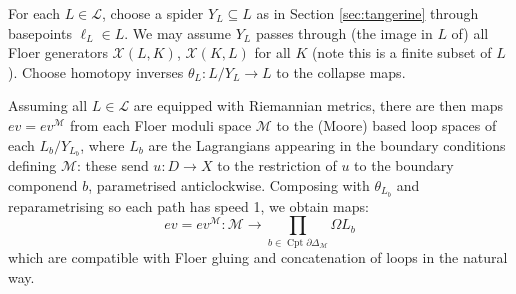\documentclass{TPmod}
\newcommand{\Cptd}{\operatorname{Cpt}\partial}
\newcommand{\cL}{\mathcal{L}}
\newcommand{\cM}{\mathcal{M}}
\newcommand{\cX}{\mathcal{X}}
\numberwithin{equation}{section}
\begin{document}
    For each $L \in \cL$, choose a spider $Y_L \subseteq L$ as in Section \ref{sec:tangerine} through basepoints $\ell_L \in L$. We may assume $Y_L$ passes through (the image in $L$ of) all Floer generators $\cX(L, K)$, $\cX(K, L)$ for all $K$ (note this is a finite subset of $L$). Choose homotopy inverses $\theta_L: L/{Y_L} \to L$ to the collapse maps.

    Assuming all $L \in \cL$ are equipped with Riemannian metrics, there are then maps $ev=ev^\cM$ from each Floer moduli space $\cM$ to the (Moore) based loop spaces of each $L_b/Y_{L_b}$, where $L_b$ are the Lagrangians appearing in the boundary conditions defining $\cM$: these send $u: D \to X$ to the restriction of $u$ to the boundary componend $b$, parametrised anticlockwise. Composing with $\theta_{L_b}$ and reparametrising so each path has speed 1, we obtain maps:
    \begin{equation}\label{eq: ev}
        ev=ev^\cM: \cM \to \prod\limits_{b \in \Cptd\Delta_\cM} \Omega L_b
    \end{equation}
    which are compatible with Floer gluing and concatenation of loops in the natural way.
\end{document}
